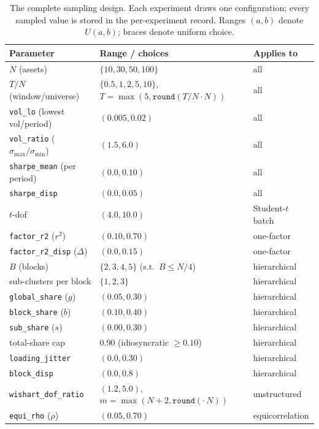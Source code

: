\documentclass[11pt]{article}
\newcommand{\TN}{T/N}
\begin{document}
\begin{table}[t]
\centering
\caption{The complete sampling design. Each experiment draws one
configuration; every sampled value is stored in the per-experiment record.
Ranges $(a,b)$ denote $U(a,b)$; braces denote uniform choice.}
\label{tab:ranges}
\small
\begin{tabular}{lll}
\toprule
Parameter & Range / choices & Applies to \\
\midrule
$N$ (assets) & $\{10, 30, 50, 100\}$ & all \\
$\TN$ (window/universe) & $\{0.5, 1, 2, 5, 10\}$, $T=\max(5,\texttt{round}(\TN\cdot N))$ & all \\
\texttt{vol\_lo} (lowest vol/period) & $(0.005, 0.02)$ & all \\
\texttt{vol\_ratio} ($\sigma_{\max}/\sigma_{\min}$) & $(1.5, 6.0)$ & all \\
\texttt{sharpe\_mean} (per period) & $(0.0, 0.10)$ & all \\
\texttt{sharpe\_disp} & $(0.0, 0.05)$ & all \\
$t$-dof & $(4.0, 10.0)$ & Student-$t$ batch \\
\midrule
\texttt{factor\_r2} ($r^2$) & $(0.10, 0.70)$ & one-factor \\
\texttt{factor\_r2\_disp} ($\Delta$) & $(0.0, 0.15)$ & one-factor \\
\midrule
$B$ (blocks) & $\{2,3,4,5\}$ (s.t.\ $B \le N/4$) & hierarchical \\
sub-clusters per block & $\{1,2,3\}$ & hierarchical \\
\texttt{global\_share} ($g$) & $(0.05, 0.30)$ & hierarchical \\
\texttt{block\_share} ($b$) & $(0.10, 0.40)$ & hierarchical \\
\texttt{sub\_share} ($s$) & $(0.00, 0.30)$ & hierarchical \\
total-share cap & $0.90$ (idiosyncratic $\ge 0.10$) & hierarchical \\
\texttt{loading\_jitter} & $(0.0, 0.30)$ & hierarchical \\
\texttt{block\_disp} & $(0.0, 0.8)$ & hierarchical \\
\midrule
\texttt{wishart\_dof\_ratio} & $(1.2, 5.0)$, $m=\max(N{+}2,\texttt{round}(\cdot\,N))$ & unstructured \\
\midrule
\texttt{equi\_rho} ($\rho$) & $(0.05, 0.70)$ & equicorrelation \\
\bottomrule
\end{tabular}
\end{table}
\end{document}
